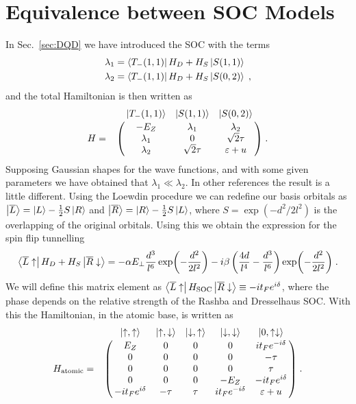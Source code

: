 \documentclass[a4paper,11pt]{article}
\begin{document}
\section{Equivalence between SOC Models}
In Sec.~\ref{sec:DQD} we have introduced the SOC with the terms
\begin{equation}
	\begin{split}
	\lambda_1&=\bra{T_-(1,1)}H_D+H_S\ket{S(1,1)}\\
	\lambda_2&=\bra{T_-(1,1)}H_D+H_S\ket{S(0,2)}\; ,
	\end{split}
\end{equation}
and the total Hamiltonian is then written as
\begin{equation}
H=\bordermatrix{~ & \ket{T_-(1,1)} & \ket{S(1,1)} & \ket{S(0,2)}\cr
	~ & -E_Z & \lambda_1 & \lambda_2 \cr
	~ & \lambda_1 & 0 & \sqrt{2}\tau \cr
	~ & \lambda_2 & \sqrt{2}\tau & \varepsilon+u \cr}\; .
\label{eq:Hamiltonian_Yue}
\end{equation}
Supposing Gaussian shapes for the wave functions, and with some given parameters we have obtained that $\lambda_1\ll\lambda_2$. In other references \cite{Bogan2018} the result is a little different. Using the Loewdin procedure we can redefine our basis orbitals as $\ket{\overline{L}}=\ket{L}-\frac{1}{2}S\ket{R}$ and $\ket{\overline{R}}=\ket{R}-\frac{1}{2}S\ket{L}$, where $S=\exp(-d^2/2l^2)$ is the overlapping of the original orbitals. Using this we obtain the expression for the spin flip tunnelling
\begin{equation}
	\bra{\overline{L}\uparrow}H_D+H_S\ket{\overline{R}\downarrow}=-\alpha E_\perp \frac{d^3}{l^6}\exp(-\frac{d^2}{2l^2})-i\beta\left(\frac{4d}{l^4}-\frac{d^3}{l^6}\right)\exp(-\frac{d^2}{2l^2})\; .
\end{equation}
We will define this matrix element as $\bra{\overline{L}\uparrow}H_{\text{SOC}}\ket{\overline{R}\downarrow}\equiv -it_Fe^{i\delta}$, where the phase depends on the relative strength of the Rashba and Dresselhaus SOC. With this the Hamiltonian, in the atomic base, is written as
\begin{equation}
H_{\text{atomic}}=\bordermatrix{~ & \ket{\uparrow,\uparrow} & \ket{\uparrow,\downarrow} & \ket{\downarrow,\uparrow} & \ket{\downarrow,\downarrow} & \ket{0,\uparrow\downarrow}\cr
	~ & E_Z   			 & 0     & 0    & 0    			   & it_Fe^{-i\delta}  \cr
	~ & 0     			 & 0     & 0    & 0    			   & -\tau  		  	\cr
	~ & 0     			 & 0     & 0    & 0    			   & \tau 		  		\cr
	~ & 0     			 & 0     & 0    & -E_Z 			   & -it_Fe^{i\delta}   \cr
	~ & -it_Fe^{i\delta} & -\tau & \tau & it_Fe^{-i\delta} & \varepsilon+u}\; .
\end{equation}
\end{document}
